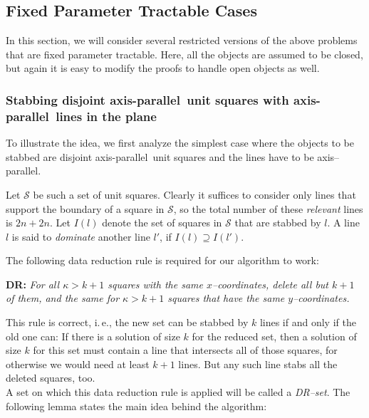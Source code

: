 \documentclass[12pt]{article}
\newcommand{\ap}{a.p.\ }
\renewcommand{\ap}{axis-parallel\ }
\newcommand{\calS}{\mathcal{S}}
\begin{document}
 
\subsection{Fixed Parameter Tractable Cases}\label{section:FPT}
In this section, we will consider several restricted versions of the above problems that are fixed parameter tractable. Here, all the objects are assumed to be closed, but again it is easy to modify the proofs to handle open objects as well.

\subsubsection{Stabbing disjoint \ap unit squares with \ap lines in the
  plane}\label{sssection:FPTDisjointUnitSquares}

To illustrate the idea, we first analyze the simplest case where the objects to be stabbed are disjoint \ap unit squares and the lines have to be axis--parallel.

Let $\calS$ be such a set of unit squares. Clearly it suffices to consider only lines that support the boundary of a square in $\calS$, so the total number of these \textit{relevant} lines is $2n + 2n$. Let $I(l)$ denote the set of squares in $\calS$ that are stabbed by $l$. A line $l$ is said to \emph{dominate} another line $l'$, if $I(l) \supseteq I(l')$.

The following data reduction rule is required for our algorithm to work:

\textbf{DR:} 
\emph{For all $\kappa > k+1$ squares with the same $x$--coordinates, delete
  all but $k+1$ of them, and the same for $\kappa > k+1$ squares that have
  the same $y$--coordinates.}

This rule is correct, i.\,e., the new set can be stabbed by $k$ lines if and only if the old one can: If there is a solution of size $k$ for the reduced set, then a solution of size $k$ for this set must contain a line that intersects all of those squares, for otherwise we would need at least $k+1$ lines. But any such line stabs all the deleted squares, too.\\

A set on which this data reduction rule is applied will be called a \textit{DR--set}. The following lemma states the main idea behind the algorithm:
\end{document}
